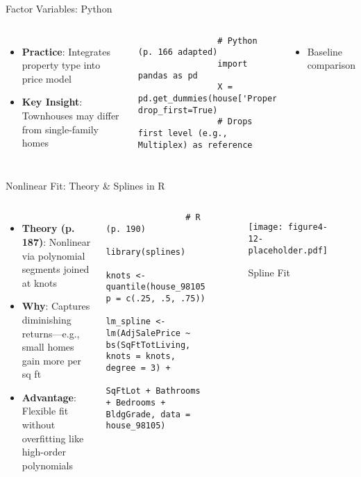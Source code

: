 \documentclass{beamer}
\begin{document}
	\begin{frame}[fragile]{Factor Variables: Python}
		\lstset{language=Python}
		\begin{columns}
			\begin{itemize}
				\item \textbf{Practice}: Integrates property type into price model
				\item \textbf{Key Insight}: Townhouses may differ from single-family homes
			\end{itemize}
			\begin{lstlisting}
				# Python (p. 166 adapted)
				import pandas as pd
				X = pd.get_dummies(house['PropertyType'], drop_first=True)
				# Drops first level (e.g., Multiplex) as reference
			\end{lstlisting}
			\begin{itemize}
				\item Baseline comparison
			\end{itemize}
		\end{columns}
	\end{frame}
	
	\begin{frame}[fragile]{Nonlinear Fit: Theory \& Splines in R}
		\begin{columns}
			\column{0.6\textwidth}
			\begin{itemize}
				\item \textbf{Theory (p. 187)}: Nonlinear via polynomial segments joined at knots
				\item \textbf{Why}: Captures diminishing returns—e.g., small homes gain more per sq ft
				\item \textbf{Advantage}: Flexible fit without overfitting like high-order polynomials
			\end{itemize}
			\begin{lstlisting}
				# R (p. 190)
				library(splines)
				knots <- quantile(house_98105$SqFtTotLiving, p = c(.25, .5, .75))
				lm_spline <- lm(AdjSalePrice ~ bs(SqFtTotLiving, knots = knots, degree = 3) +
				SqFtLot + Bathrooms + Bedrooms + BldgGrade, data = house_98105)
			\end{lstlisting}
			\column{0.4\textwidth}
			\begin{figure}
				\texttt{[image: figure4-12-placeholder.pdf]}
				\caption{Spline Fit}
			\end{figure}
		\end{columns}
	\end{frame}
	
\end{document}
